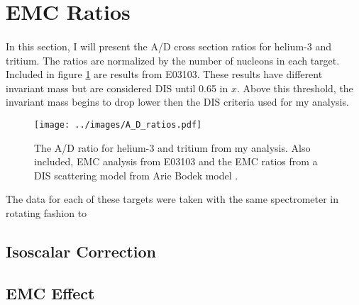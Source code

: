 \section{EMC Ratios}
\paragraph{}In this section, I will present the A/D cross section ratios for helium-3 and tritium. The ratios are normalized by the number of nucleons in each target. Included in figure \ref{ADplot} are results from E03103. These results have different invariant mass but are considered DIS until 0.65 in $x$. Above this threshold, the invariant mass begins to drop lower then the DIS criteria used for my analysis. 
\begin{figure}
	\centering
	\texttt{[image: ../images/A\_D\_ratios.pdf]}
	\caption{The A/D ratio for helium-3 and tritium from my analysis. Also included, EMC analysis from E03103\cite{seeley} and the EMC ratios from a DIS scattering model from Arie Bodek model \cite{DISmodel}.}
	\label{ADplot}
\end{figure}
The data for each of these targets were taken with the same spectrometer in rotating fashion to 




\subsection{Isoscalar Correction}
\subsection{EMC Effect}

